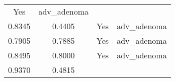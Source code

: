 \documentclass[12pt,]{article}
\begin{document}
\begin{longtable}[]{@{}cccc@{}}
\begin{minipage}[t]{0.22\columnwidth}
Yes\strut
\end{minipage} & \begin{minipage}[t]{0.16\columnwidth}\centering\strut
adv\_adenoma\strut
\end{minipage}\tabularnewline
\begin{minipage}[t]{0.24\columnwidth}\centering\strut
0.8345\strut
\end{minipage} & \begin{minipage}[t]{0.26\columnwidth}\centering\strut
0.4405\strut
\end{minipage} & \begin{minipage}[t]{0.22\columnwidth}\centering\strut
Yes\strut
\end{minipage} & \begin{minipage}[t]{0.16\columnwidth}\centering\strut
adv\_adenoma\strut
\end{minipage}\tabularnewline
\begin{minipage}[t]{0.24\columnwidth}\centering\strut
0.7905\strut
\end{minipage} & \begin{minipage}[t]{0.26\columnwidth}\centering\strut
0.7885\strut
\end{minipage} & \begin{minipage}[t]{0.22\columnwidth}\centering\strut
Yes\strut
\end{minipage} & \begin{minipage}[t]{0.16\columnwidth}\centering\strut
adv\_adenoma\strut
\end{minipage}\tabularnewline
\begin{minipage}[t]{0.24\columnwidth}\centering\strut
0.8495\strut
\end{minipage} & \begin{minipage}[t]{0.26\columnwidth}\centering\strut
0.8000\strut
\end{minipage} & \begin{minipage}[t]{0.22\columnwidth}\centering\strut
Yes\strut
\end{minipage} & \begin{minipage}[t]{0.16\columnwidth}\centering\strut
adv\_adenoma\strut
\end{minipage}\tabularnewline
\begin{minipage}[t]{0.24\columnwidth}\centering\strut
0.9370\strut
\end{minipage} & \begin{minipage}[t]{0.26\columnwidth}\centering\strut
0.4815\strut
\end{minipage} & \begin{minipage}[t]{0.22\columnwidth}\centering\strut

\end{minipage}
\end{longtable}
\end{document}
